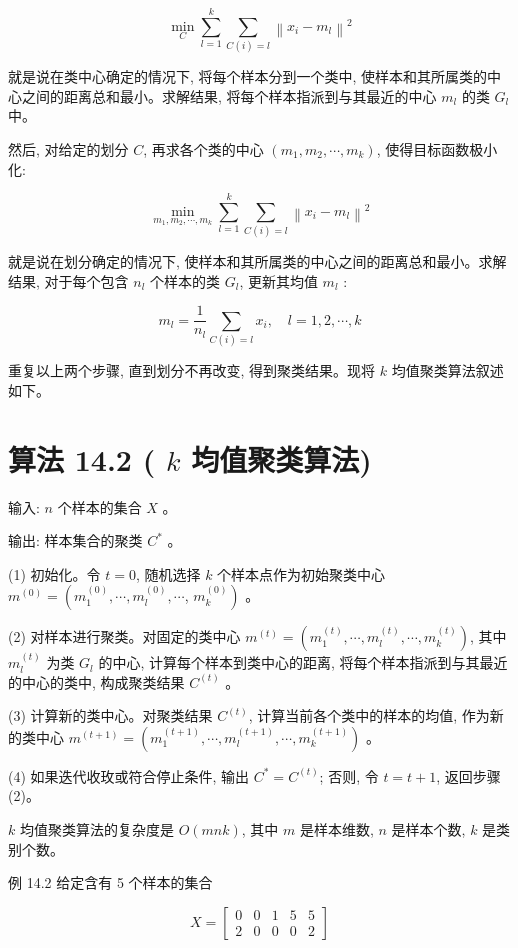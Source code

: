 \documentclass[10pt]{article}
\begin{document}
\begin{equation*}
\min _{C} \sum_{l=1}^{k} \sum_{C(i)=l}\left\|x_{i}-m_{l}\right\|^{2} \tag{14.22}
\end{equation*}


就是说在类中心确定的情况下, 将每个样本分到一个类中, 使样本和其所属类的中心之间的距离总和最小。求解结果, 将每个样本指派到与其最近的中心 $m_{l}$ 的类 $G_{l}$ 中。

然后, 对给定的划分 $C$, 再求各个类的中心 $\left(m_{1}, m_{2}, \cdots, m_{k}\right)$, 使得目标函数极小化:

$$
\min _{m_{1}, m_{2}, \cdots, m_{k}} \sum_{l=1}^{k} \sum_{C(i)=l}\left\|x_{i}-m_{l}\right\|^{2}
$$

就是说在划分确定的情况下, 使样本和其所属类的中心之间的距离总和最小。求解结果, 对于每个包含 $n_{l}$ 个样本的类 $G_{l}$, 更新其均值 $m_{l}$ :

$$
m_{l}=\frac{1}{n_{l}} \sum_{C(i)=l} x_{i}, \quad l=1,2, \cdots, k
$$

重复以上两个步骤, 直到划分不再改变, 得到聚类结果。现将 $k$ 均值聚类算法叙述如下。

\section*{算法 14.2 ( $k$ 均值聚类算法)}
输入: $n$ 个样本的集合 $X$ 。

输出: 样本集合的聚类 $C^{*}$ 。

(1) 初始化。令 $t=0$, 随机选择 $k$ 个样本点作为初始聚类中心 $m^{(0)}=\left(m_{1}^{(0)}, \cdots, m_{l}^{(0)}, \cdots\right.$, $\left.m_{k}^{(0)}\right)$ 。

(2) 对样本进行聚类。对固定的类中心 $m^{(t)}=\left(m_{1}^{(t)}, \cdots, m_{l}^{(t)}, \cdots, m_{k}^{(t)}\right)$, 其中 $m_{l}^{(t)}$ 为类 $G_{l}$ 的中心, 计算每个样本到类中心的距离, 将每个样本指派到与其最近的中心的类中, 构成聚类结果 $C^{(t)}$ 。

(3) 计算新的类中心。对聚类结果 $C^{(t)}$, 计算当前各个类中的样本的均值, 作为新的类中心 $m^{(t+1)}=\left(m_{1}^{(t+1)}, \cdots, m_{l}^{(t+1)}, \cdots, m_{k}^{(t+1)}\right)$ 。

(4) 如果迭代收玫或符合停止条件, 输出 $C^{*}=C^{(t)}$; 否则, 令 $t=t+1$, 返回步骤 (2)。

$k$ 均值聚类算法的复杂度是 $O(m n k)$, 其中 $m$ 是样本维数, $n$ 是样本个数, $k$ 是类别个数。

例 14.2 给定含有 5 个样本的集合

$$
X=\left[\begin{array}{lllll}
0 & 0 & 1 & 5 & 5 \\
2 & 0 & 0 & 0 & 2
\end{array}\right]
$$
\end{document}

